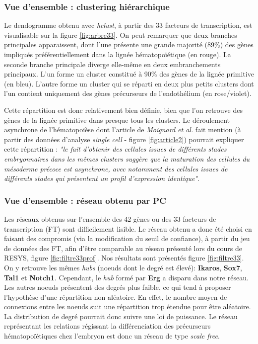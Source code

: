 \documentclass[fleqn,11pt]{SelfArx} %
\begin{document}
\subsubsection{Vue d'ensemble : clustering hiérarchique}
Le dendogramme obtenu avec \textit{hclust}, à partir des 33 facteurs de transcription, est visualisable sur la figure \ref{fig:arbre33}. On peut remarquer que deux branches principales apparaissent, dont l'une présente une grande majorité (89\%) des gènes impliqués préférentiellement dans la lignée hématopoïétique (en rouge). La seconde branche principale diverge elle-même en deux embranchements principaux. L'un forme un cluster constitué à 90\% des gènes de la lignée primitive (en bleu). L'autre forme un cluster qui se réparti en deux plus petits clusters dont l'un contient uniquement des gènes précurseurs de l'endothélium (en rose/violet). 

\par Cette répartition est donc relativement bien définie, bien que l'on retrouve des gènes de la lignée primitive dans presque tous les clusters. Le déroulement asynchrone de l'hématopoïèse dont l'article de \textit{Moignard et al.} fait mention (à partir des données d'analyse \textit{single cell} - figure \ref{fig:article2}) pourrait expliquer cette répartition : \textit{"le fait d'obtenir des cellules issues de différents stades embryonnaires dans les mêmes clusters suggère que la maturation des cellules du mésoderme précoce est asynchrone, avec notamment des cellules issues de différents stades qui présentent un profil d'expression identique"}.


\subsubsection{Vue d'ensemble : réseau obtenu par PC}
Les réseaux obtenus sur l'ensemble des 42 gènes ou des 33 facteurs de transcription (FT) sont difficilement lisible. Le réseau obtenu a donc été choisi en faisant des compromis (via la modification du seuil de confiance), à partir du jeu de données des FT, afin d'être comparable au réseau présenté lors du cours de RESYS, figure \ref{fig:filtre33prof}. Nos résultats sont présentés figure \ref{fig:filtre33}. On y retrouve les mêmes \textit{hubs} (noeuds dont le degré est élevé): \textbf{Ikaros}, \textbf{Sox7}, \textbf{Tal1} et \textbf{Notch1}. Cependant, le \textit{hub} formé par \textbf{Erg} a disparu dans notre réseau. Les autres noeuds présentent des degrés plus faible, ce qui tend à proposer l'hypothèse d'une répartition non aléatoire. En effet, le nombre moyen de connexions entre les noeuds suit une répartition trop étendue pour être aléatoire. La distribution de degré pourrait donc suivre une loi de puissance. Le réseau représentant les relations régissant la différenciation des précurseurs hématopoïétiques chez l'embryon est donc un réseau de type \textit{scale free}\href{http://eaton.math.rpi.edu/CSUMS/Papers/ScaleFree/Scale-Free\%20Networks.pdf}{\cite{Scale}}.
\end{document}
